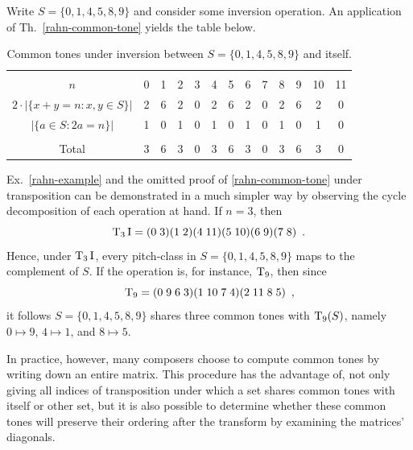 \begin{example}
    \label{rahn-example}
    \cite[11]{Rahn1975}
    Write $S = \{ 0, 1, 4, 5, 8, 9 \}$ and consider some inversion operation. An application of Th.~\ref{rahn-common-tone} yields the table below.
    \begin{table}[htbp]
    \caption[Rahn's Common Tones Under Inversion]{Common tones under inversion between $S = \{ 0, 1, 4, 5, 8, 9 \}$ and itself.}
    \centering
    \vspace{12pt}
    \begin{tabular}{ c | *{12}{c} }
        \hline\\
        $n$ & 0 & 1 & 2 & 3 & 4 & 5 & 6 & 7 & 8 & 9 & 10 & 11 \\
        $2 \cdot |\{x + y = n : x, y \in S\}|$ & 2 & 6 & 2 & 0 & 2 & 6 & 2 & 0 & 2 & 6 & 2 & 0 \\
        $|\{a \in S : 2a = n\}|$ & 1 & 0 & 1 & 0 & 1 & 0 & 1 & 0 & 1 & 0 & 1 & 0 \\
        \hline\\
        Total & 3 & 6 & 3 & 0 & 3 & 6 & 3 & 0 & 3 & 6 & 3 & 0 \\
        \hline
    \end{tabular}
    \end{table}
\end{example}

\begin{example}
	Ex.~\ref{rahn-example} and the omitted proof of \ref{rahn-common-tone} under transposition can be demonstrated in a much simpler way by observing the cycle decomposition of each operation at hand. If $n = 3$, then
	\begin{equation}
		\operatorname{T}_3\operatorname{I} = (0 \; 3) (1 \; 2) (4 \; 11) (5 \; 10) (6 \; 9) (7 \; 8) \enspace.
	\end{equation}
	Hence, under $\operatorname{T}_3\operatorname{I}$, every pitch-class in $S = \{ 0, 1, 4, 5, 8, 9 \}$ maps to the complement of $S$. If the operation is, for instance, $\operatorname{T}_9$, then since
	\begin{equation}
		\operatorname{T}_9 = (0 \; 9 \; 6 \; 3) (1 \; 10 \; 7 \; 4) (2 \; 11 \; 8 \; 5) \enspace,
	\end{equation}
	it follows $S = \{ 0, 1, 4, 5, 8, 9 \}$ shares three common tones with $\operatorname{T}_9(S)$, namely $0 \mapsto 9$, $4 \mapsto 1$, and $8 \mapsto 5$.
\end{example}

In practice, however, many composers choose to compute common tones by writing down an entire matrix. This procedure has the advantage of, not only giving all indices of transposition under which a set shares common tones with itself or other set, but it is also possible to determine whether these common tones will preserve their ordering after the transform by examining the matrices' diagonals.

